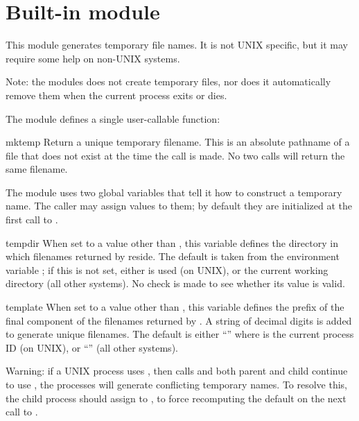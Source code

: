 \section{Built-in module }

\renewcommand{\indexsubitem}{(in module tempfile)}

This module generates temporary file names.  It is not UNIX specific,
but it may require some help on non-UNIX systems.

Note: the modules does not create temporary files, nor does it
automatically remove them when the current process exits or dies.

The module defines a single user-callable function:

\begin{funcdesc}{mktemp}{}
Return a unique temporary filename.  This is an absolute pathname of a
file that does not exist at the time the call is made.  No two calls
will return the same filename.
\end{funcdesc}

The module uses two global variables that tell it how to construct a
temporary name.  The caller may assign values to them; by default they
are initialized at the first call to .

\begin{datadesc}{tempdir}
When set to a value other than , this variable defines the
directory in which filenames returned by  reside.  The
default is taken from the environment variable ; if this
is not set, either  is used (on UNIX), or the current
working directory (all other systems).  No check is made to see
whether its value is valid.
\end{datadesc}

\begin{datadesc}{template}
When set to a value other than , this variable defines the
prefix of the final component of the filenames returned by
.  A string of decimal digits is added to generate
unique filenames.  The default is either ``'' where
 is the current process ID (on UNIX), or ``'' (all
other systems).
\end{datadesc}

Warning: if a UNIX process uses , then calls
 and both parent and child continue to use
, the processes will generate conflicting temporary
names.  To resolve this, the child process should assign 
to , to force recomputing the default on the next call
to .
